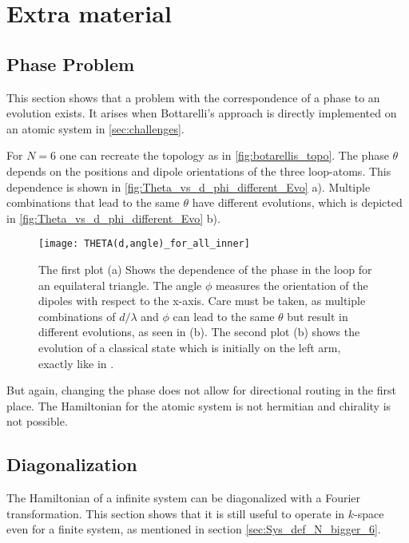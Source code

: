 
\chapter{Extra material} %

\label{AppendixA} %

\section{Phase Problem} \label{sec:No_direcionality}
This section shows that a problem with the correspondence of a phase to an evolution exists.
It arises when Bottarelli's approach is directly implemented on an atomic system in \autoref{sec:challenges}.

\noindent
For $ N = 6 $ one can recreate the topology as in \autoref{fig:botarellis_topo}.
The phase $ \theta $ depends on the positions and dipole orientations of the three loop-atoms.
This dependence is shown in \autoref{fig:Theta_vs_d_phi_different_Evo} a).
Multiple combinations that lead to the same $ \theta $ have different evolutions,
which is depicted in \autoref{fig:Theta_vs_d_phi_different_Evo} b).
\begin{figure}[ht]
    \centering
    \texttt{[image: THETA(d,angle)\_for\_all\_inner]}
    \caption{The first plot (a) Shows the dependence of the phase in the loop for an equilateral triangle.
    The angle $ \phi $ measures the orientation of the dipoles with respect to the x-axis.
    Care must be taken, as multiple combinations of $d/\lambda$ and $ \phi $ can lead to the same $ \theta $ but result in different evolutions, as seen in (b).
    The second plot (b) shows the evolution of a classical state which is initially on the left arm, exactly like in \cite{Startingpoint}.}
    \label{fig:Theta_vs_d_phi_different_Evo}
\end{figure}
But again, changing the phase does not allow for directional routing in the first place.
The Hamiltonian for the atomic system is not hermitian and chirality is not possible.

\newpage
\section{Diagonalization} \label{sec:Diagonalization}
The Hamiltonian of a infinite system can be diagonalized with a Fourier transformation.
This section shows that it is still useful to operate in $k$-space even for a finite system, as mentioned in section \ref{sec:Sys_def_N_bigger_6}.

